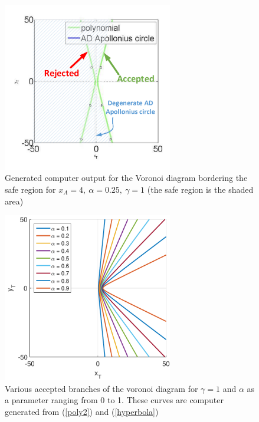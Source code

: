 \begin{figure}[htb]
\centering
\includegraphics[width=0.66\textwidth]{fig/g_1.pdf}
\caption{Generated computer output for the Voronoi diagram bordering the safe region for $x_A=4,\ \alpha=0.25,\ \gamma=1$ (the safe region is the shaded area)}
\label{gamma=1}
\end{figure}

\begin{figure}[htb]
\centering
\includegraphics[width=0.66\textwidth]{fig/VAR_alpha_g_1.pdf}
\caption{Various accepted branches of the voronoi diagram for $\gamma=1$ and $\alpha$ as a parameter ranging from 0 to 1. These curves are computer generated from (\ref{poly2}) and (\ref{hyperbola})}
\label{VAR_alpha_gamma=1}
\end{figure}


